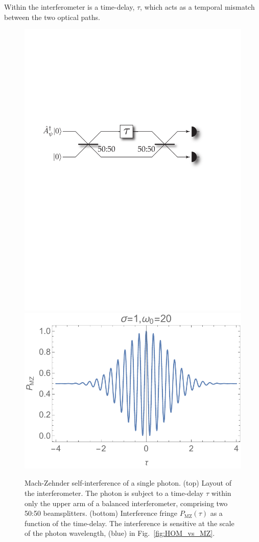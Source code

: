 \documentclass[aps, rmp, twocolumn, amsmath, amssymb, nofootinbib, superscriptaddress, longbibliography, floatfix, table-of-contents, eqsecnum]{revtex4-1}
\begin{document}
Within the interferometer is a time-delay, $\tau$, which acts as a temporal mismatch between the two optical paths. 

\begin{figure}[!htb]
	\includegraphics[width=\columnwidth]{MZ_setup} \\
	\includegraphics[width=\columnwidth]{MZ}
	\caption{Mach-Zehnder self-interference of a single photon. (top) Layout of the interferometer. The photon is subject to a time-delay $\tau$ within only the upper arm of a balanced interferometer, comprising two 50:50 beamsplitters. (bottom) Interference fringe $P_\text{MZ}(\tau)$ as a function of the time-delay. The interference is sensitive at the scale of the photon wavelength, (blue) in Fig.~\ref{fig:HOM_vs_MZ}.} \label{fig:MZ_inter}
\end{figure}
\end{document}
